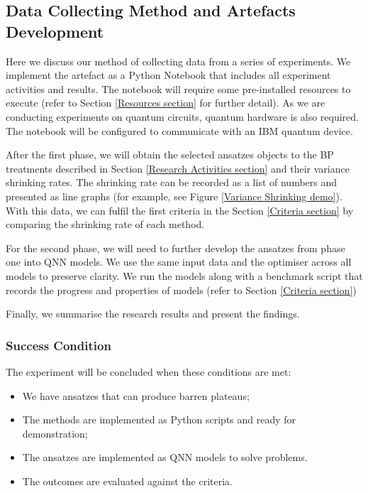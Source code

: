 \subsection{Data Collecting Method and Artefacts Development}
\label{Data Collecting Section}
Here we discuss our method of collecting data from a series of experiments.
We implement the artefact as a Python Notebook that includes all experiment activities and results.
The notebook will require some pre-installed resources to execute (refer to Section \ref{Resources section} for further detail).
As we are conducting experiments on quantum circuits, quantum hardware is also required.
The notebook will be configured to communicate with an IBM quantum device.

After the first phase, we will obtain the selected ansatzes objects to the BP treatments described in Section \ref{Research Activities section} and their variance shrinking rates.
The shrinking rate can be recorded as a list of numbers and presented as line graphs (for example, see Figure \ref{Variance Shrinking demo}).
With this data, we can fulfil the first criteria in the Section \ref{Criteria section} by comparing the shrinking rate of each method.

For the second phase, we will need to further develop the ansatzes from phase one into QNN models. We use the same input data and the optimiser across all models to preserve clarity.
We run the models along with a benchmark script that records the progress and properties of models (refer to Section \ref{Criteria section})

Finally, we summarise the research results and present the findings.

\subsubsection{Success Condition}
The experiment will be concluded when these conditions are met:
\begin{itemize}
    \item We have ansatzes that can produce barren plateaus;
    \item The methods are implemented as Python scripts and ready for demonstration;
    \item The ansatzes are implemented as QNN models to solve problems.
    \item The outcomes are evaluated against the criteria.
\end{itemize}